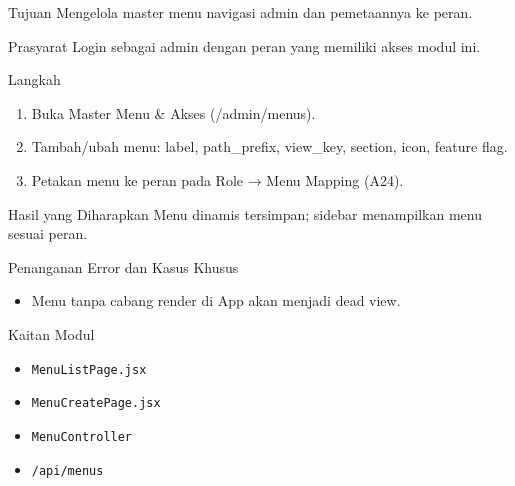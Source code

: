 
\begin{flowsection}{Tujuan}
Mengelola master menu navigasi admin dan pemetaannya ke peran.
\end{flowsection}

\begin{flowsection}{Prasyarat}
Login sebagai admin dengan peran yang memiliki akses modul ini.
\end{flowsection}

\begin{flowsection}{Langkah}
\begin{enumerate}
  \item Buka Master Menu \&  Akses (/admin/menus).
  \item Tambah/ubah menu: label, path\_prefix, view\_key, section, icon, feature flag.
  \item Petakan menu ke peran pada Role → Menu Mapping (A24).
\end{enumerate}
\end{flowsection}


\begin{flowsection}{Hasil yang Diharapkan}
Menu dinamis tersimpan; sidebar menampilkan menu sesuai peran.
\end{flowsection}

\begin{flowsection}{Penanganan Error dan Kasus Khusus}
\begin{itemize}
  \item Menu tanpa cabang render di App akan menjadi dead view.
\end{itemize}
\end{flowsection}

\begin{flowsection}{Kaitan Modul}
\begin{itemize}
  \item \texttt{MenuListPage.jsx}
  \item \texttt{MenuCreatePage.jsx}
  \item \texttt{MenuController}
  \item \texttt{/api/menus}
\end{itemize}
\end{flowsection}

